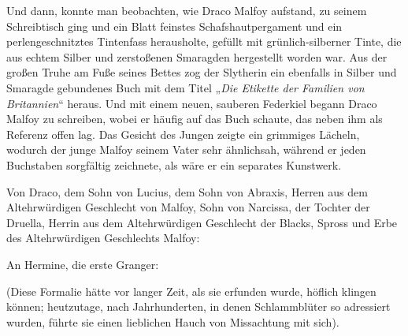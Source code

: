 Und dann, konnte man beobachten, wie Draco Malfoy aufstand, zu seinem Schreibtisch ging und ein Blatt feinstes Schafshautpergament und ein perlengeschnitztes Tintenfass herausholte, gefüllt mit grünlich-silberner Tinte, die aus echtem Silber und zerstoßenen Smaragden hergestellt worden war. Aus der großen Truhe am Fuße seines Bettes zog der Slytherin ein ebenfalls in Silber und Smaragde gebundenes Buch mit dem Titel „\emph{Die Etikette der Familien von Britannien}“ heraus. Und mit einem neuen, sauberen Federkiel begann Draco Malfoy zu schreiben, wobei er häufig auf das Buch schaute, das neben ihm als Referenz offen lag. Das Gesicht des Jungen zeigte ein grimmiges Lächeln, wodurch der junge Malfoy seinem Vater sehr ähnlichsah, während er jeden Buchstaben sorgfältig zeichnete, als wäre er ein separates Kunstwerk.

\begin{writtenNote}
Von Draco, dem Sohn von Lucius, dem Sohn von Abraxis, Herren aus dem Altehrwürdigen Geschlecht von Malfoy, Sohn von Narcissa, der Tochter der Druella, Herrin aus dem Altehrwürdigen Geschlecht der Blacks, Spross und Erbe des Altehrwürdigen Geschlechts Malfoy:

An Hermine, die erste Granger:
\end{writtenNote}

(Diese Formalie hätte vor langer Zeit, als sie erfunden wurde, höflich klingen können; heutzutage, nach Jahrhunderten, in denen Schlammblüter so adressiert wurden, führte sie einen lieblichen Hauch von Missachtung mit sich).

